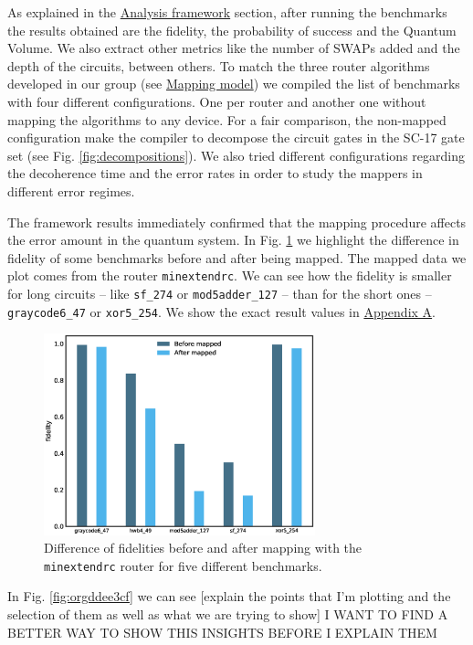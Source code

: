 \label{tab:map_selected_benchs}

As explained in the \href{chapter-4.org}{Analysis framework} section, after running the benchmarks the results obtained are the fidelity, the probability of success and the Quantum Volume.
We also extract other metrics like the number of SWAPs added and the depth of the circuits, between others.
To match the three router algorithms developed in our group (see \href{chapter-3.org}{Mapping model}) we compiled the list of benchmarks with four different configurations.
One per router and another one without mapping the algorithms to any device.
For a fair comparison, the non-mapped configuration make the compiler to decompose the circuit gates in the SC-17 gate set (see Fig. \ref{fig:decompositions}).
We also tried different configurations regarding the decoherence time and the error rates in order to study the mappers in different error regimes.


The framework results immediately confirmed that the mapping procedure affects the error amount in the quantum system.
In Fig. \ref{fig:org7c67968} we highlight the difference in fidelity of some benchmarks before and after being mapped.
The mapped data we plot comes from the router \texttt{minextendrc}.
We can see how the fidelity is smaller for long circuits -- like \texttt{sf\_274} or \texttt{mod5adder\_127} -- than for the short ones -- \texttt{graycode6\_47} or \texttt{xor5\_254}.
We show the exact result values in \href{appendix-1.org}{Appendix A}.

\begin{figure}[htbp]
\centering
\includegraphics[width=0.7\textwidth]{figures/f_diff_bar_plot.eps}
\caption{\label{fig:org7c67968}
Difference of fidelities before and after mapping with the \texttt{minextendrc} router for five different benchmarks.}
\end{figure}
In Fig. \ref{fig:orgddee3cf} we can see [explain the points that I'm plotting and the selection of them as well as what we are trying to show]
I WANT TO FIND A BETTER WAY TO SHOW THIS INSIGHTS BEFORE I EXPLAIN THEM

